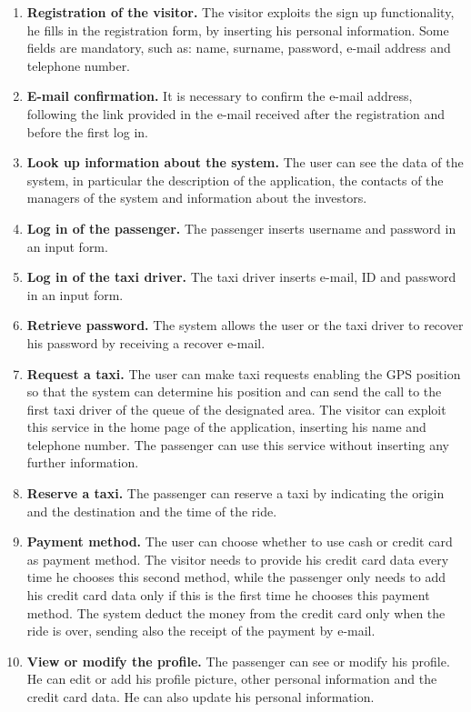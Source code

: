 \documentclass[18pt,oneside,a4paper, titlepage]{article}
\begin{document}
		\begin{enumerate}
			\item \textbf{Registration of the visitor.}
				The visitor exploits the sign up functionality, he fills in the registration form, by inserting his personal information. Some fields are mandatory, such as: name, surname, password, e-mail address and telephone number.
			\item \textbf{E-mail confirmation.}
				It is necessary to confirm the e-mail address, following the link provided in the e-mail received after the registration and before the first log in.
			\item \textbf{Look up information about the system.}
				The user can see the data of the system, in particular the description of the application, the contacts of the managers of the system and information about the investors.
			\item \textbf{Log in of the passenger.}
				The passenger inserts username and password in an input form.
			\item \textbf{Log in of the taxi driver.}
				The taxi driver inserts e-mail, ID and password in an input form.
			\item \textbf{Retrieve password.}
				The system allows the user or the taxi driver to recover his password by receiving a recover e-mail.
			\item \textbf{Request a taxi.}
				The user can make taxi requests enabling the GPS position so that the system can determine his position and can send the call to the first taxi driver of the queue of the designated area. 
				The visitor can exploit this service in the home page of the application, inserting his name and telephone number.
				The passenger can use this service without inserting any further information.
			\item \textbf{Reserve a taxi.}
				The passenger can reserve a taxi by indicating the origin and the destination and the time of the ride.
			\item \textbf{Payment method.}
				The user can choose whether to use cash or credit card as payment method. The visitor needs to provide his credit card data every time he chooses this second method, while the passenger only needs to add his credit card data only if this is the first time he chooses this payment method. The system deduct the money from the credit card only when the ride is over, sending also the receipt of the payment by e-mail.
			\item \textbf{View or modify the profile.}
				The passenger can see or modify his profile. He can edit or add his profile picture, other personal information and the credit card data. He can also update his personal information.

\end{enumerate}
\end{document}
